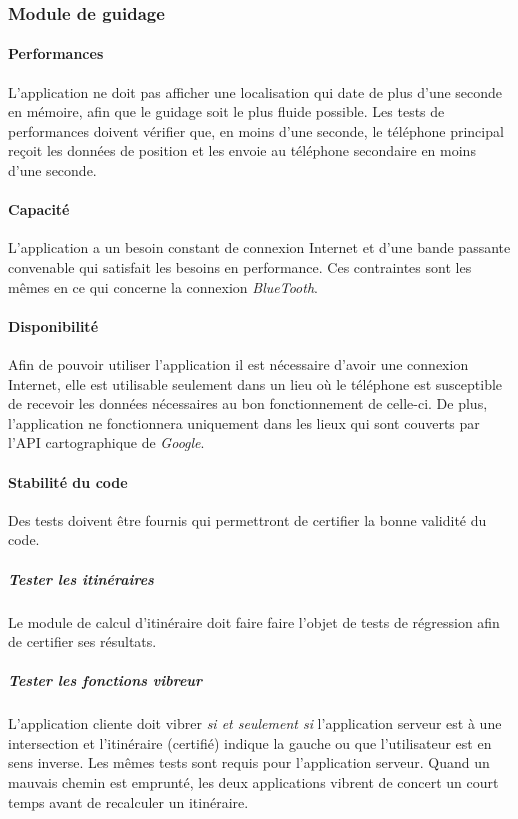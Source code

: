 {\subsubsection{Module de guidage} 
\paragraph{Performances} L'application ne doit pas afficher une localisation qui date de plus d'une seconde en mémoire, afin que le guidage soit le plus fluide possible. Les tests de performances doivent vérifier que, en moins d'une seconde, le téléphone principal reçoit les données de position et les envoie au téléphone secondaire en moins d'une seconde.

\paragraph{Capacité} L'application a un besoin constant de connexion Internet et d'une bande passante convenable qui satisfait les besoins en performance. Ces contraintes sont les mêmes en ce qui concerne la connexion \textit{BlueTooth}.

\paragraph{Disponibilité}
Afin de pouvoir utiliser l'application il est nécessaire d'avoir une connexion Internet, elle est utilisable seulement dans un lieu où le téléphone est susceptible de recevoir les données nécessaires au bon fonctionnement de celle-ci. De plus, l'application ne fonctionnera uniquement dans les lieux qui sont couverts par l'API cartographique de \textit{Google}.

\paragraph{Stabilité du code}
Des tests doivent être fournis qui permettront de certifier la bonne validité du code. 
\subparagraph{Tester les itinéraires} Le module de calcul d'itinéraire doit faire faire l'objet de tests de régression afin de certifier ses résultats.
\subparagraph{Tester les fonctions vibreur} L'application cliente doit vibrer \emph{si et seulement si} l'application serveur est à une intersection et l'itinéraire (certifié) indique la gauche ou que l'utilisateur est en sens inverse. Les mêmes tests sont requis pour l'application serveur. Quand un mauvais chemin est emprunté, les deux applications vibrent de concert un court temps avant de recalculer un itinéraire.

}
